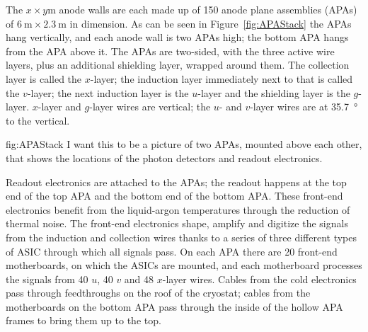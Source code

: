 The $x\times y$\si{\meter} anode walls are each made up of 150 anode plane assemblies (APAs) of $\SI{6}{\meter}\times\SI{2.3}{\meter}$ in dimension. As can be seen in Figure~\ref{fig:APAStack} the APAs hang vertically, and each anode wall is two APAs high; the bottom APA hangs from the APA above it. The APAs are two-sided, with the three active wire layers, plus an additional shielding layer, wrapped around them. The collection layer is called the $x$-layer; the induction layer immediately next to that is called the $v$-layer; the next induction layer is the $u$-layer and the shielding layer is the $g$-layer. $x$-layer and $g$-layer wires are vertical; the $u$- and $v$-layer wires are at \SI{35.7}{\degree} to the vertical.

\begin{dunefigure}{fig:APAStack}
{I want this to be a picture of two APAs, mounted above each other, that shows the locations of the photon detectors and readout electronics.}
\end{dunefigure}

Readout electronics are attached to the APAs; the readout happens at the top end of the top APA and the bottom end of the bottom APA. These front-end electronics benefit from the liquid-argon temperatures through the reduction of thermal noise. The front-end electronics shape, amplify and digitize the signals from the induction and collection wires thanks to a series of three different types of ASIC through which all signals pass. On each APA there are 20 front-end motherboards, on which the ASICs are mounted, and each motherboard processes the signals from 40 $u$, 40 $v$ and 48 $x$-layer wires. Cables from the cold electronics pass through feedthroughs on the roof of the cryostat; cables from the motherboards on the bottom APA pass through the inside of the hollow APA frames to bring them up to the top.

